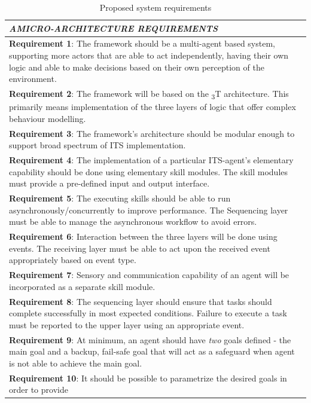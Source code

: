 \documentclass[main.tex]{subfiles}
\begin{document}
\begin{table}[htbp]
    \small
    \caption{Proposed system requirements}
    \centering\begin{tabular}{>{\footnotesize}p{}}
        \toprule 
\emph{\textbf{A}\quad MICRO-ARCHITECTURE REQUIREMENTS}\\ \midrule
\textbf{Requirement 1}: The framework should be a multi-agent based system, supporting more actors 
that are able to act independently, having their own logic and able to make decisions based on their 
own perception of the environment.
\\ \midrule
\textbf{Requirement 2}: The framework will be based on the \textsubscript{3}T architecture. 
This primarily means implementation of the three layers of logic that offer complex behaviour 
modelling.
\\ \midrule
\textbf{Requirement 3}: The framework's architecture should be modular enough to support broad 
spectrum of ITS implementation.
\\ \midrule
\textbf{Requirement 4}: The implementation of a particular ITS-agent's elementary
capability should be done using elementary skill modules. The skill modules must provide a
pre-defined input and output interface.
\\ \midrule
\textbf{Requirement 5}: The executing skills should be able to run asynchronously/concurrently to improve 
performance. The Sequencing layer must be able to manage the asynchronous workflow to avoid errors.
 \\ \midrule
\textbf{Requirement 6}: Interaction between the three layers will be done using events. The 
receiving layer must be able to act upon the received event appropriately based on event type.
 \\ \midrule
\textbf{Requirement 7}: Sensory and communication capability of an agent will be incorporated 
as a separate skill module.
\\ \midrule
\textbf{Requirement 8}: The sequencing layer should ensure that tasks should complete successfully 
in most expected conditions. Failure to execute a task must be reported to the upper layer using an 
appropriate event.
\\ \midrule
\textbf{Requirement 9}: At minimum, an agent should have \emph{two} goals defined - the main goal
and a backup, fail-safe goal that will act as a safeguard when agent is not able to achieve the main 
goal. \\ \midrule
\textbf{Requirement 10}: It should be possible to parametrize the desired goals in order to provide 

\end{tabular}
\end{table}
\end{document}
